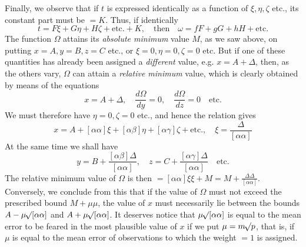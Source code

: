 Finally, we observe that if \(t\) is expressed identically as a function of \(\xi,\eta,\zeta\) etc., its constant part must be \(=K\). Thus, if identically
\[
t=F\xi+G\eta+H\zeta+\text{etc.}+K,\quad\text{then}\quad\omega=fF+gG+hH+\text{etc.}
\]
The function \(\Omega\) attains its \textit{absolute minimum} value \(M\), as we saw above, on putting \(x=A,\allowbreak y=B,\allowbreak z=C\) etc., or \(\xi=0,\allowbreak\eta=0,\allowbreak\zeta=0\) etc. But if one of these quantities has already been assigned a \textit{different} value, e.g. \(x=A+\Delta\), then, as the others vary, \(\Omega\) can attain a \textit{relative minimum} value, which is clearly obtained by means of the equations
\[
x=A+\Delta,\quad\frac{d\Omega}{dy}=0,\quad\frac{d\Omega}{dz}=0\quad\text{etc.}
\]
We must therefore have \(\eta=0,\zeta=0\) etc., and hence the relation gives
\[
x=A+[\alpha\alpha]\xi+[\alpha\beta]\eta+[\alpha\gamma]\zeta+\text{etc.},\quad\xi=\frac{\Delta}{[\alpha\alpha]}
\]
At the same time we shall have
\[
y=B+\frac{[\alpha\beta]\Delta}{[\alpha\alpha]},\quad z=C+\frac{[\alpha\gamma]\Delta}{[\alpha\alpha]}\quad\text{etc.}
\]
The relative minimum value of \(\Omega\) is then \(=[\alpha\alpha]\xi\xi+M=M+\frac{\Delta\Delta}{[\alpha\alpha]}\). Conversely, we conclude from this that if the value of \(\Omega\) must not exceed the prescribed bound \(M+\mu\mu\), the value of \(x\) must necessarily lie between the bounds \(A-\mu\mathord{{}^{}\!\surd}[\alpha\alpha]\) and \(A+\mu\mathord{{}^{}\!\surd}[\alpha\alpha]\). It deserves notice that \(\mu\mathord{{}^{}\!\surd}[\alpha\alpha]\) is equal to the mean error to be feared in the most plausible value of \(x\) if we put \(\mu=m\mathord{{}^{}\!\surd}p\), that is, if \(\mu\) is equal to the mean error of observations to which the weight \(=1\) is assigned.

